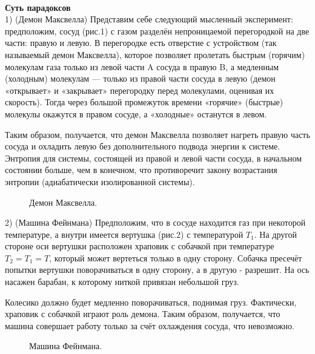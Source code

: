 \documentclass[a4paper, 12pt]{article}
\begin{document}
\newline\

\textbf{Суть парадоксов}\\

1) (Демон Максвелла) Представим себе следующий мысленный эксперимент: предположим, сосуд (рис.1) с газом разделён непроницаемой перегородкой на две части: правую и левую. В перегородке есть отверстие с устройством (так называемый демон Максвелла), которое позволяет пролетать быстрым (горячим) молекулам газа только из левой части A сосуда в правую B, а медленным (холодным) молекулам — только из правой части сосуда в левую (демон «открывает» и «закрывает» перегородку перед молекулами, оценивая их скорость). Тогда через большой промежуток времени «горячие» (быстрые) молекулы окажутся в правом сосуде, а «холодные» останутся в левом.

Таким образом, получается, что демон Максвелла позволяет нагреть правую часть сосуда и охладить левую без дополнительного подвода энергии к системе. Энтропия для системы, состоящей из правой и левой части сосуда, в начальном состоянии больше, чем в конечном, что противоречит закону возрастания энтропии (адиабатически изолированной системы).

\begin{figure}[h!]
\caption{Демон Максвелла.}
\label{ris:image}
\end{figure}

2) (Машина Фейнмана) Предположим, что в сосуде находится газ при некоторой температуре, а внутри имеется вертушка (рис.2) с температурой $T_1$. На другой стороне оси вертушки расположен храповик с собачкой при температуре $T_2 = T_1 = T$, который может вертеться только в одну сторону. Собачка пресечёт попытки вертушки поворачиваться в одну сторону, а в другую - разрешит. На ось насажен барабан, к которому ниткой привязан небольшой груз.

Колесико должно будет медленно поворачиваться, поднимая груз. Фактически, храповик с собачкой играют роль демона. Таким образом, получается, что машина совершает работу только за счёт охлаждения сосуда, что невозможно.
\begin{figure}[h!]
\caption{Машина Фейнмана.}
\label{ris:image}
\end{figure}
\end{document}
